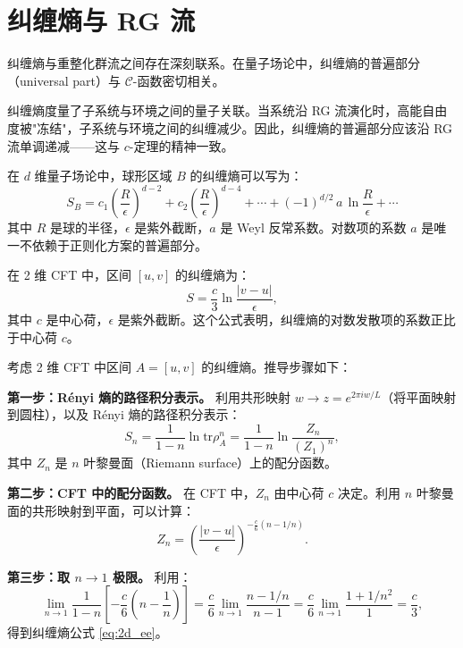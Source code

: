 \section{纠缠熵与 RG 流}

纠缠熵与重整化群流之间存在深刻联系。在量子场论中，纠缠熵的普遍部分（universal part）与 $\mathcal{C}$-函数密切相关。

\begin{note}[物理动机]
纠缠熵度量了子系统与环境之间的量子关联。当系统沿 RG 流演化时，高能自由度被"冻结"，子系统与环境之间的纠缠减少。因此，纠缠熵的普遍部分应该沿 RG 流单调递减——这与 $c$-定理的精神一致。
\end{note}

\begin{definition}[纠缠熵的普遍部分]\label{def:universal_ee}
在 $d$ 维量子场论中，球形区域 $B$ 的纠缠熵可以写为：
\begin{equation}
    S_B = c_1\left(\frac{R}{\epsilon}\right)^{d-2} + c_2\left(\frac{R}{\epsilon}\right)^{d-4} + \cdots + (-1)^{d/2}\,a\,\ln\frac{R}{\epsilon} + \cdots
\end{equation}
其中 $R$ 是球的半径，$\epsilon$ 是紫外截断，$a$ 是 Weyl 反常系数。对数项的系数 $a$ 是唯一不依赖于正则化方案的普遍部分。
\end{definition}

在 2 维 CFT 中，区间 $[u, v]$ 的纠缠熵为：
\begin{equation}\label{eq:2d_ee}
    S = \frac{c}{3} \ln \frac{|v - u|}{\epsilon},
\end{equation}
其中 $c$ 是中心荷，$\epsilon$ 是紫外截断。这个公式表明，纠缠熵的对数发散项的系数正比于中心荷 $c$。

\begin{proposition}[2维纠缠熵公式推导]\label{prop:2d_ee_derivation}
考虑 2 维 CFT 中区间 $A = [u, v]$ 的纠缠熵。推导步骤如下：

\textbf{第一步：R\'enyi 熵的路径积分表示。} 利用共形映射 $w \to z = e^{2\pi i w/L}$（将平面映射到圆柱），以及 R\'enyi 熵的路径积分表示：
\begin{equation}
    S_n = \frac{1}{1-n}\ln\text{tr}\rho_A^n = \frac{1}{1-n}\ln\frac{Z_n}{(Z_1)^n},
\end{equation}
其中 $Z_n$ 是 $n$ 叶黎曼面（Riemann surface）上的配分函数。

\textbf{第二步：CFT 中的配分函数。} 在 CFT 中，$Z_n$ 由中心荷 $c$ 决定。利用 $n$ 叶黎曼面的共形映射到平面，可以计算：
\begin{equation}
    Z_n = \left(\frac{|v-u|}{\epsilon}\right)^{-\frac{c}{6}(n-1/n)}.
\end{equation}

\textbf{第三步：取 $n \to 1$ 极限。} 利用：
\begin{equation}
    \lim_{n\to 1}\frac{1}{1-n}\left[-\frac{c}{6}\left(n-\frac{1}{n}\right)\right] = \frac{c}{6}\lim_{n\to 1}\frac{n - 1/n}{n - 1} = \frac{c}{6}\lim_{n\to 1}\frac{1 + 1/n^2}{1} = \frac{c}{3},
\end{equation}
得到纠缠熵公式 \eqref{eq:2d_ee}。
\end{proposition}

